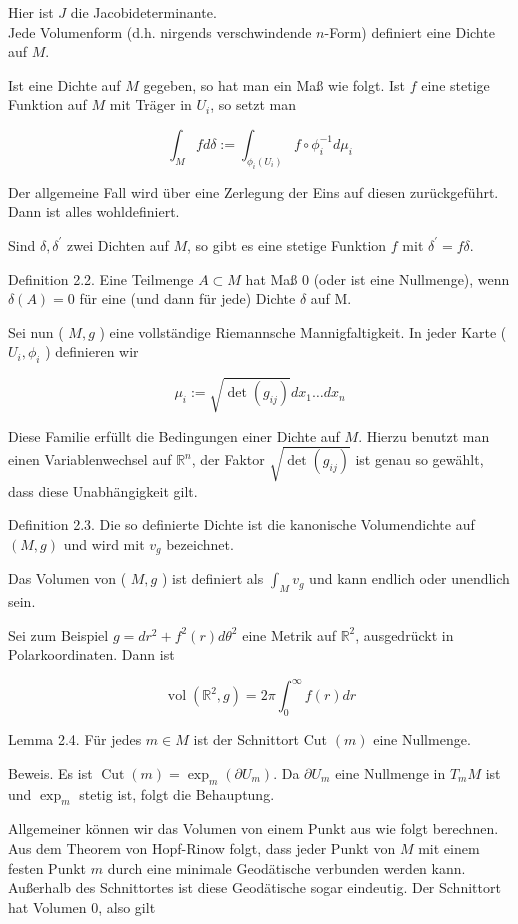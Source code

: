 \documentclass[10pt, letterpaper]{article}
\begin{document}
Hier ist $J$ die Jacobideterminante.\\
Jede Volumenform (d.h. nirgends verschwindende $n$-Form) definiert eine Dichte auf $M$.

Ist eine Dichte auf $M$ gegeben, so hat man ein Maß wie folgt. Ist $f$ eine stetige Funktion auf $M$ mit Träger in $U_{i}$, so setzt man

$$
\int_{M} f d \delta:=\int_{\phi_{i}\left(U_{i}\right)} f \circ \phi_{i}^{-1} d \mu_{i}
$$

Der allgemeine Fall wird über eine Zerlegung der Eins auf diesen zurückgeführt. Dann ist alles wohldefiniert.

Sind $\delta, \delta^{\prime}$ zwei Dichten auf $M$, so gibt es eine stetige Funktion $f$ mit $\delta^{\prime}=f \delta$.

Definition 2.2. Eine Teilmenge $A \subset M$ hat Maß 0 (oder ist eine Nullmenge), wenn $\delta(A)=0$ für eine (und dann für jede) Dichte $\delta$ auf M.

Sei nun ( $M, g$ ) eine vollständige Riemannsche Mannigfaltigkeit. In jeder Karte ( $U_{i}, \phi_{i}$ ) definieren wir

$$
\mu_{i}:=\sqrt{\operatorname{det}\left(g_{i j}\right)} d x_{1} \ldots d x_{n}
$$

Diese Familie erfüllt die Bedingungen einer Dichte auf $M$. Hierzu benutzt man einen Variablenwechsel auf $\mathbb{R}^{n}$, der Faktor $\sqrt{\operatorname{det}\left(g_{i j}\right)}$ ist genau so gewählt, dass diese Unabhängigkeit gilt.

Definition 2.3. Die so definierte Dichte ist die kanonische Volumendichte auf $(M, g)$ und wird mit $v_{g}$ bezeichnet.

Das Volumen von ( $M, g$ ) ist definiert als $\int_{M} v_{g}$ und kann endlich oder unendlich sein.

Sei zum Beispiel $g=d r^{2}+f^{2}(r) d \theta^{2}$ eine Metrik auf $\mathbb{R}^{2}$, ausgedrückt in Polarkoordinaten. Dann ist

$$
\operatorname{vol}\left(\mathbb{R}^{2}, g\right)=2 \pi \int_{0}^{\infty} f(r) d r
$$

Lemma 2.4. Für jedes $m \in M$ ist der Schnittort Cut $(m)$ eine Nullmenge.

Beweis. Es ist $\operatorname{Cut}(m)=\exp _{m}\left(\partial U_{m}\right)$. Da $\partial U_{m}$ eine Nullmenge in $T_{m} M$ ist und $\exp _{m}$ stetig ist, folgt die Behauptung.

Allgemeiner können wir das Volumen von einem Punkt aus wie folgt berechnen. Aus dem Theorem von Hopf-Rinow folgt, dass jeder Punkt von $M$ mit einem festen Punkt $m$ durch eine minimale Geodätische verbunden werden kann. Außerhalb des Schnittortes ist diese Geodätische sogar eindeutig. Der Schnittort hat Volumen 0, also gilt
\end{document}
